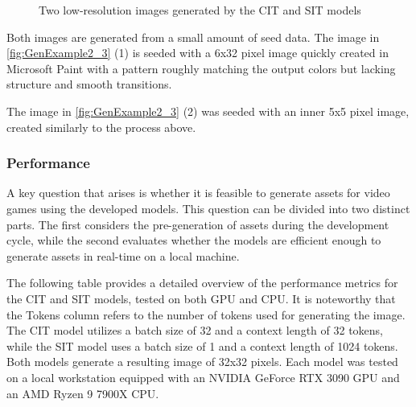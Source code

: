 \begin{itemize}
\begin{figure}[H]
\begin{minipage}{0.30\textwidth}
                    \label{fig:GenExample3}
                \end{minipage}
                \caption{Two low-resolution images generated by the CIT and SIT models}
                \label{fig:GenExample2_3}
            \end{figure}
            
            Both images are generated from a small amount of seed data. The image in \autoref{fig:GenExample2_3} (1) is seeded with a 6x32 pixel image quickly created in Microsoft Paint with a pattern roughly matching the output colors but lacking structure and smooth transitions.
    
            The image in \autoref{fig:GenExample2_3} (2) was seeded with an inner 5x5 pixel image, created similarly to the process above.
    \end{itemize}
    
    

\subsubsection{Performance}

    A key question that arises is whether it is feasible to generate assets for video games using the developed models. This question can be divided into two distinct parts. The first considers the pre-generation of assets during the development cycle, while the second evaluates whether the models are efficient enough to generate assets in real-time on a local machine.

    The following table provides a detailed overview of the performance metrics for the CIT and SIT models, tested on both GPU and CPU. It is noteworthy that the Tokens column refers to the number of tokens used for generating the image. The CIT model utilizes a batch size of 32 and a context length of 32 tokens, while the SIT model uses a batch size of 1 and a context length of 1024 tokens. Both models generate a resulting image of 32x32 pixels. Each model was tested on a local workstation equipped with an NVIDIA GeForce RTX 3090 GPU and an AMD Ryzen 9 7900X CPU.

